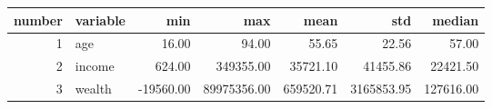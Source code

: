 \begin{tabular}{rlrrrrr}
\toprule
number & variable & min & max & mean & std & median \\
\midrule
1 & age & 16.00 & 94.00 & 55.65 & 22.56 & 57.00 \\
2 & income & 624.00 & 349355.00 & 35721.10 & 41455.86 & 22421.50 \\
3 & wealth & -19560.00 & 89975356.00 & 659520.71 & 3165853.95 & 127616.00 \\
\bottomrule
\end{tabular}
